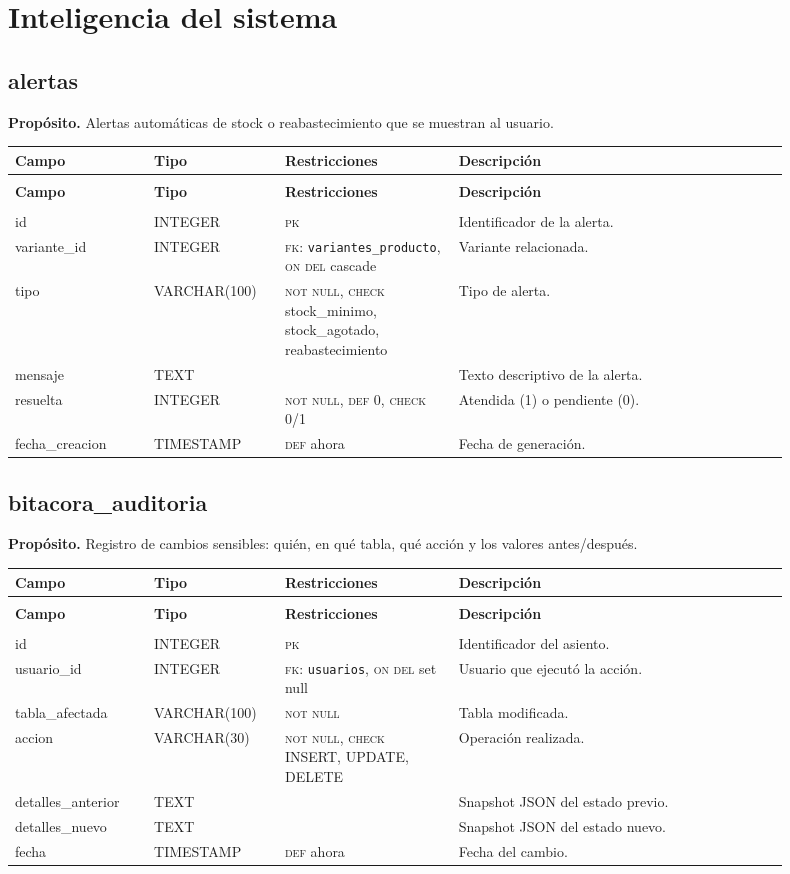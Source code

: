 \documentclass[11pt]{article}
\makeatletter
\newenvironment{campos}{%
  \par\footnotesize
  \setlength{\LTpre}{0.3ex}\setlength{\LTpost}{0.6ex}
  \begin{longtable}{@{}>{\ttfamily}p{0.165\linewidth} >{\ttfamily}p{0.150\linewidth} p{0.205\linewidth} >{\raggedright\arraybackslash}p{0.385\linewidth}@{}}
  \toprule
  \normalfont\bfseries Campo & \normalfont\bfseries Tipo & \normalfont\bfseries Restricciones & \normalfont\bfseries Descripción \\
  \midrule \endfirsthead
  \multicolumn{4}{@{}l}{\footnotesize\itshape \dots\ continuación}\\[0.3ex]
  \toprule
  \normalfont\bfseries Campo & \normalfont\bfseries Tipo & \normalfont\bfseries Restricciones & \normalfont\bfseries Descripción \\
  \midrule \endhead
  \midrule \multicolumn{4}{r@{}}{\footnotesize\itshape continúa en la siguiente página}\\ \endfoot
  \bottomrule \endlastfoot
}{%
  \end{longtable}\par
}
\newcommand{\proposito}[1]{\par\vspace{0.2ex}\noindent\colorbox{brandlight}{\parbox{\dimexpr\linewidth-2\fboxsep}{\small\textbf{Propósito.} #1}}\par\vspace{0.8ex}}
\newcommand{\pk}{\textsc{pk}}
\newcommand{\fk}[1]{\textsc{fk}: \texttt{#1}}
\newcommand{\nn}{\textsc{not null}}
\makeatother
\begin{document}
\section{Inteligencia del sistema}

\subsection{alertas}
\proposito{Alertas automáticas de stock o reabastecimiento que se muestran al usuario.}
\begin{campos}
id             & INTEGER      & \pk{}   & Identificador de la alerta. \\
variante\_id   & INTEGER      & \fk{variantes\_producto}, \textsc{on del} cascade & Variante relacionada. \\
tipo           & VARCHAR(100) & \nn, \textsc{check} stock\_minimo, stock\_agotado, reabastecimiento & Tipo de alerta. \\
mensaje        & TEXT         &         & Texto descriptivo de la alerta. \\
resuelta       & INTEGER      & \nn, \textsc{def} 0, \textsc{check} 0/1 & Atendida (1) o pendiente (0). \\
fecha\_creacion & TIMESTAMP   & \textsc{def} ahora & Fecha de generación. \\
\end{campos}

\subsection{bitacora\_auditoria}
\proposito{Registro de cambios sensibles: quién, en qué tabla, qué acción y los valores antes/después.}
\begin{campos}
id                & INTEGER      & \pk{}   & Identificador del asiento. \\
usuario\_id       & INTEGER      & \fk{usuarios}, \textsc{on del} set null & Usuario que ejecutó la acción. \\
tabla\_afectada   & VARCHAR(100) & \nn     & Tabla modificada. \\
accion            & VARCHAR(30)  & \nn, \textsc{check} INSERT, UPDATE, DELETE & Operación realizada. \\
detalles\_anterior & TEXT        &         & Snapshot JSON del estado previo. \\
detalles\_nuevo   & TEXT         &         & Snapshot JSON del estado nuevo. \\
fecha             & TIMESTAMP    & \textsc{def} ahora & Fecha del cambio. \\
\end{campos}
\end{document}
